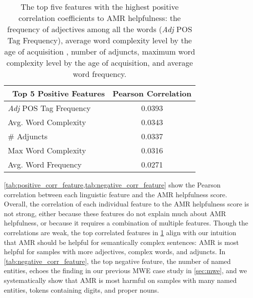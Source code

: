\begin{table}[t]
    \centering \small
    \begin{tabular}{lc}
    \toprule\
    Top 5 Positive Features & Pearson Correlation \\ 
    \midrule
    \textit{Adj} POS Tag Frequency & 0.0393\\
    Avg. Word Complexity & 0.0343 \\
    \# Adjuncts & 0.0337 \\
    Max Word Complexity & 0.0316 \\
    Avg. Word Frequency & 0.0271\\
    \bottomrule
    \end{tabular}
    \caption{
    The top five features with the highest positive correlation coefficients to AMR helpfulness: the frequency of adjectives among all the words (\textit{Adj} POS Tag Frequency), average word complexity level by the age of acquisition \citep{Kuperman2012Ageofacquisition}, number of adjuncts, maximum word complexity level by the age of acquisition, and average word frequency.
}
    \label{tab:positive_corr_feature}
    \vspace{1em}
\end{table}



\cref{tab:positive_corr_feature,tab:negative_corr_feature} show the Pearson correlation between each linguistic feature and the AMR helpfulness score.
Overall, the correlation of each individual feature to the AMR helpfulness score is not strong, either because these features do not explain much about AMR helpfulness, or because it requires a combination of multiple features. Though the correlations are weak, the top correlated features in \cref{tab:positive_corr_feature} align with our intuition that AMR should be helpful for semantically complex sentences:
AMR is most helpful for samples with more adjectives, complex words, and adjuncts. 
In
\cref{tab:negative_corr_feature}, the top negative feature, the number of named entities, echoes the finding in our previous MWE case study in \cref{sec:mwe}, and we systematically show that AMR
 is most harmful on samples with many named entities, tokens containing digits, and proper nouns.


